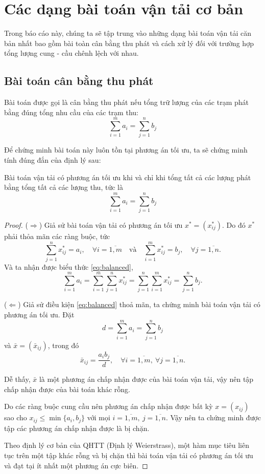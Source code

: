 \documentclass[../main.tex]{subfiles}
\begin{document}
\section{Các dạng bài toán vận tải cơ bản}

Trong báo cáo này, chúng ta sẽ tập trung vào những dạng bài toán vận tải căn bản nhất bao gồm bài toàn cân bằng thu phát và cách xử lý đối với trường hợp tổng lượng cung - cầu chênh lệch với nhau.

\subsection{Bài toán cân bằng thu phát}
Bài toán được gọi là cân bằng thu phát nếu tổng trữ lượng của các trạm phát bằng đúng tổng nhu cầu của các trạm thu:
\begin{equation} \label{eq:balanced}
    \sum_{i=1}^{m} a_i = \sum_{j=1}^{n} b_j
\end{equation}

Để chứng minh bài toán này luôn tồn tại phương án tối ưu, ta sẽ chứng minh tính đúng đắn của định lý sau:

\begin{theorem} \label{thm:existence}
    Bài toán vận tải có phương án tối ưu khi và chỉ khi tổng tất cả các lượng phát bằng tổng tất cả các lượng thu, tức là
    \begin{equation}
        \sum_{i=1}^{m} a_i = \sum_{j=1}^{n} b_j \label{eq:balanced}
    \end{equation}
\end{theorem}
\begin{proof}

    \noindent ($\Rightarrow$) Giả sử bài toán vận tải có phương án tối ưu $x^* = (x_{ij}^*)$. Do đó $x^*$ phải thỏa mãn các ràng buộc, tức
    \[ \sum_{j=1}^{n} x_{ij}^* = a_i, \quad \forall i = \overline{1,m}  \quad \text{và} \quad \sum_{i=1}^{m} x_{ij}^* = b_j, \quad \forall j = \overline{1,n}. \]
    Và ta nhận được biểu thức \eqref{eq:balanced},
    \[ \sum_{i=1}^{m} a_i = \sum_{i=1}^{m} \sum_{j=1}^{n} x_{ij}^* = \sum_{j=1}^{n} \sum_{i=1}^{m} x_{ij}^* = \sum_{j=1}^{n} b_j. \]

    \noindent ($\Leftarrow$) Giả sử điều kiện \eqref{eq:balanced} thoả mãn, ta chứng minh bài toán vận tải có phương án tối ưu. Đặt
    \[ d = \sum_{i=1}^{m} a_i = \sum_{j=1}^{n} b_j \]
    và $\bar{x} = (\bar{x}_{ij})$, trong đó
    \[ \bar{x}_{ij} = \frac{a_i b_j}{d}, \quad \forall i = \overline{1,m}, \ \forall j = \overline{1,n}. \]

    Dễ thấy, $\bar{x}$ là một phương án chấp nhận được của bài toán vận tải, vậy nên tập chấp nhận được của bài toán khác rỗng.
    
    Do các ràng buộc cung cầu nên phương án chấp nhận được bất kỳ $x = (x_{ij})$ sao cho $x_{ij} \le \min\{a_i, b_j\}$ với mọi $i = \overline{1,m}, \ j = \overline{1,n}$. Vậy nên ta chứng minh được tập các phương án chấp nhận được là bị chặn. 
    
    Theo định lý cơ bản của QHTT (Định lý Weierstrass), một hàm mục tiêu liên tục trên một tập khác rỗng và bị chặn thì bài toán vận tải có phương án tối ưu và đạt tại ít nhất một phương án cực biên.
\end{proof}
\end{document}
